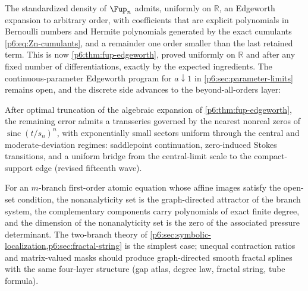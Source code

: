 \documentclass[11pt,oneside]{article}
\numberwithin{equation}{section}
\theoremstyle{definition}
\theoremstyle{remark}
\newcommand{\R}{\mathbb R}
\newcommand{\sinc}{\operatorname{sinc}}
\begin{document}
\begin{conjecture}
The standardized density of $\Fup_n$ admits, uniformly on $\R$, an Edgeworth
expansion to arbitrary order, with coefficients that are explicit polynomials
in Bernoulli numbers and Hermite polynomials generated by the exact cumulants
\eqref{p6:eq:Zn-cumulants}, and a remainder one order smaller than the last
retained term.
This is now \cref{p6:thm:fup-edgeworth}, proved uniformly on $\R$ and after
any fixed number of differentiations, exactly by the expected ingredients.
The continuous-parameter Edgeworth program for $a\downarrow1$ in
\cref{p6:sec:parameter-limits} remains open, and the discrete side advances
to the beyond-all-orders layer:
\end{conjecture}

\begin{conjecture}
After optimal truncation of the algebraic expansion of
\cref{p6:thm:fup-edgeworth}, the remaining error admits a transseries
governed by the nearest nonreal zeros of $\sinc(t/s_n)^n$, with exponentially
small sectors uniform through the central and moderate-deviation regimes:
saddlepoint continuation, zero-induced Stokes transitions, and a uniform
bridge from the central-limit scale to the compact-support edge (revised
fifteenth wave).
\end{conjecture}

\begin{conjecture}
For an $m$-branch first-order atomic equation whose affine images satisfy the
open-set condition, the nonanalyticity set is the graph-directed attractor of
the branch system, the complementary components carry polynomials of exact
finite degree, and the dimension of the nonanalyticity set is the zero of the
associated pressure determinant.  The two-branch theory of
\cref{p6:sec:symbolic-localization,p6:sec:fractal-string} is the simplest
case; unequal contraction ratios and matrix-valued masks should produce
graph-directed smooth fractal splines with the same four-layer structure
(gap atlas, degree law, fractal string, tube formula).
\end{conjecture}
\end{document}
